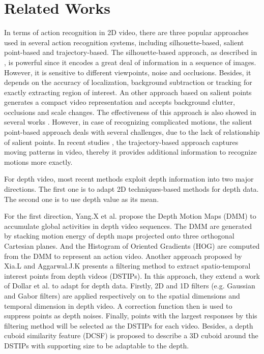\documentclass[final,3p,times,twocolumn]{elsarticle}
\begin{document}
\section{Related Works}
\label{lbl:RelatedWorks}

In terms of action recognition in 2D video, there are three popular approaches used in several action recognition systems, including silhouette-based, salient point-based and trajectory-based.
The silhouette-based approach, as described in \cite{blank2005actions, ke2007event, vitaladevuni2008action, yilmaz2005actions}, is powerful since it encodes a great deal of information in a sequence of images.
However, it is sensitive to different viewpoints, noise and occlusions.
Besides, it depends on the accuracy of localization, background subtraction or tracking for exactly extracting region of interest.
An other approach based on salient points generates a compact video representation and accepts background clutter, occlusions and scale changes.
The effectiveness of this approach is also showed in several works \cite{laptev2005space, dollar2005behavior, laptev2008learning, bregonzio2009recognising, klaser2008aspatiotemporal, willems2008efficient}.
However, in case of recognizing complicated motions, the salient point-based approach deals with several challenges, due to the lack of relationship of salient points.
In recent studies \cite{matikainen2009trajectons, messing2009activity, sun2009hierarchical}, the trajectory-based approach captures moving patterns in video, thereby it provides additional information to recognize motions more exactly.

For depth video, most recent methods exploit depth information into two major directions. The first one is to adapt 2D techniques-based methods for depth data. The second one is to use depth value as its mean.

For the first direction, Yang.X et al. \cite{yang2012recognizing} propose the Depth Motion Maps (DMM) to accumulate global activities in depth video sequences. The DMM are generated by stacking motion energy of depth maps projected onto three orthogonal Cartesian planes. And the Histogram of Oriented Gradients (HOG) \cite{dalal2005histograms} are computed from the DMM to represent an action video. Another approach proposed by Xia.L and Aggarwal.J.K \cite{xia2013spatio} presents a filtering method to extract spatio-temporal interest points from depth videos (DSTIPs). In this approach, they extend a work of Dollar et al. \cite{dollar2005behavior} to adapt for depth data. Firstly, 2D and 1D filters (e.g. Gaussian and Gabor filters) are applied respectively on to the spatial dimensions and temporal dimension in depth video. A correction function then is used to suppress points as depth noises. Finally, points with the largest responses by this filtering method will be selected as the DSTIPs for each video. Besides, a depth cuboid similarity feature (DCSF) is proposed to describe a 3D cuboid around the DSTIPs with supporting size to be adaptable to the depth.
\end{document}
